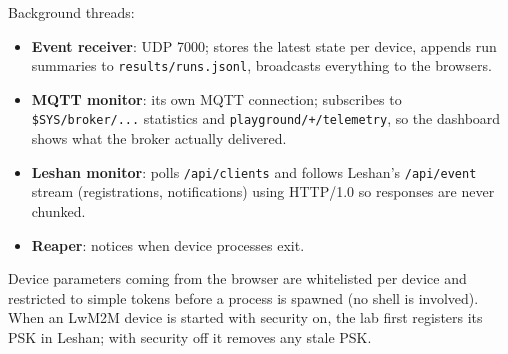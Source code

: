 \documentclass[11pt,a4paper]{article}
\newcommand{\code}[1]{\texttt{#1}}
\begin{document}
Background threads:
\begin{itemize}
  \item \textbf{Event receiver}: UDP 7000; stores the latest state per device,
        appends run summaries to \code{results/runs.jsonl}, broadcasts
        everything to the browsers.
  \item \textbf{MQTT monitor}: its own MQTT connection; subscribes to
        \code{\$SYS/broker/...} statistics and \code{playground/+/telemetry}, so
        the dashboard shows what the broker actually delivered.
  \item \textbf{Leshan monitor}: polls \code{/api/clients} and follows
        Leshan's \code{/api/event} stream (registrations, notifications) using
        HTTP/1.0 so responses are never chunked.
  \item \textbf{Reaper}: notices when device processes exit.
\end{itemize}
Device parameters coming from the browser are whitelisted per device and
restricted to simple tokens before a process is spawned (no shell is
involved). When an LwM2M device is started with security on, the lab first
registers its PSK in Leshan; with security off it removes any stale PSK.
\end{document}
